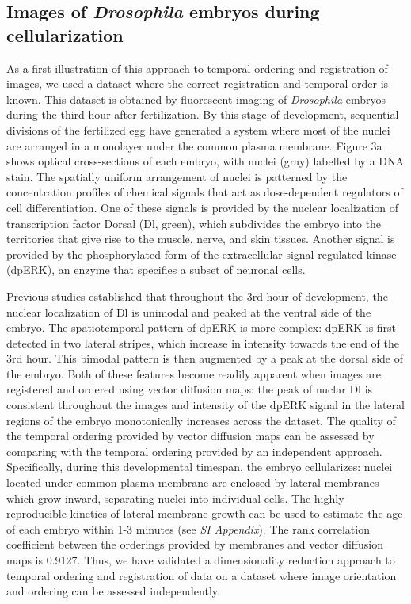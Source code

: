 \documentclass{pnastwo}
\begin{document}
\begin{article}
\subsection{Images of {\it Drosophila} embryos during cellularization}

%
As a first illustration of this approach to temporal ordering and registration of images, we used a dataset where the correct registration and temporal order is known. 
%
This dataset is obtained by fluorescent imaging of {\it Drosophila} embryos during the third hour after fertilization.
%
By this stage of development, sequential divisions of the fertilized egg have generated a system where most of the nuclei are arranged in a monolayer under the common plasma membrane.
%
Figure 3a shows optical cross-sections of each embryo, with nuclei (gray) labelled by a DNA stain. 
%
The spatially uniform arrangement of nuclei is patterned by the concentration profiles of chemical signals that act as dose-dependent regulators of cell differentiation.
%
One of these signals is provided by the nuclear localization of transcription factor Dorsal (Dl, green), which subdivides the embryo into the territories that give rise to the muscle, nerve, and skin tissues.
%
Another signal is provided by the phosphorylated form of the extracellular signal regulated kinase (dpERK), an enzyme that specifies a subset of neuronal cells. 
%

Previous studies \cite{...} established that throughout the 3rd hour of development, the nuclear localization of Dl is unimodal and peaked at the ventral side of the embryo. 
%
The spatiotemporal pattern of dpERK is more complex: dpERK is first detected in two lateral stripes, which increase in intensity towards the end of the 3rd hour. 
%
This bimodal pattern is then augmented by a peak at the dorsal side of the embryo.
%
Both of these features become readily apparent when images are registered and ordered using vector diffusion maps: the peak of nuclar Dl is consistent throughout the images and intensity of the dpERK signal in the lateral regions of the embryo monotonically increases across the dataset.
%
The quality of the temporal ordering provided by vector diffusion maps can be assessed by comparing with the temporal ordering provided by an independent approach.
%
Specifically, during this developmental timespan, the embryo cellularizes: nuclei located under common plasma membrane are enclosed by lateral membranes which grow inward, separating nuclei into individual cells.
%
The highly reproducible kinetics of lateral membrane growth can be used to estimate the age of each embryo within 1-3 minutes  \cite{...} (see {\it SI Appendix}).    
%
The rank correlation coefficient between the orderings provided by membranes and vector diffusion maps is 0.9127. 
%
Thus, we have validated a dimensionality reduction approach to temporal ordering and registration of data  on a dataset where image orientation and ordering can be assessed independently. 


\end{article}
\end{document}
